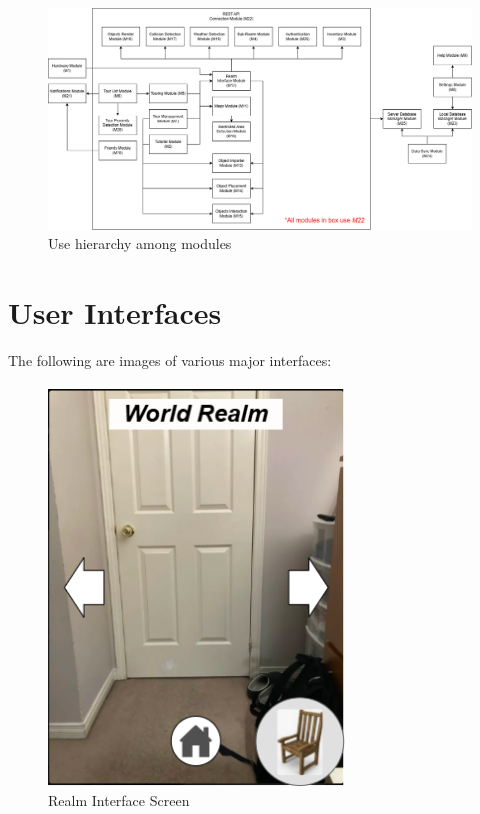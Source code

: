 \documentclass[12pt, titlepage]{article}
\begin{document}
\begin{figure}[H]
\centering
\includegraphics[width=1\textwidth]{UsesHierarchy.png}
\caption{Use hierarchy among modules}
\label{FigUH}
\end{figure}


\section{User Interfaces}

The following are images of various major interfaces:

\begin{figure}[H]
\centering
\includegraphics[width=0.7\textwidth]{RIScreen.png}
\caption{Realm Interface Screen}
\label{FigRI}
\end{figure}
\end{document}
